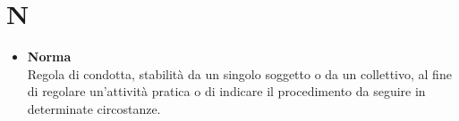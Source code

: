 \chapter{N} \label{N}
	\begin{itemize}
		\item \textbf{Norma}\\
		Regola di condotta, stabilità da un singolo soggetto o da un collettivo, al fine di regolare un'attività pratica o di indicare il procedimento da seguire in determinate circostanze.
	\end{itemize}